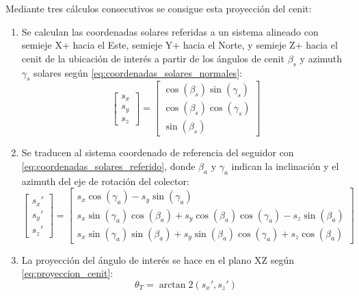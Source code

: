 Mediante tres cálculos consecutivos se consigue esta proyección del cenit:

\begin{enumerate}
    \item Se calculan las coordenadas solares referidas a un sistema alineado con semieje X+ hacia el Este, semieje Y+ hacia el Norte, y semieje Z+ hacia el cenit de la ubicación de interés a partir de los ángulos de cenit $\beta_s$ y azimuth $\gamma_s$ solares según \ref{eq:coordenadas_solares_normales}:
          \begin{equation} \label{eq:coordenadas_solares_normales}
              \begin{bmatrix}
                  s_x \\
                  s_y \\
                  s_z
              \end{bmatrix} = \begin{bmatrix}
                  \cos(\beta_s) \sin(\gamma_s) \\
                  \cos(\beta_s) \cos(\gamma_s) \\
                  \sin(\beta_s)
              \end{bmatrix}
          \end{equation}
    \item Se traducen al sistema coordenado de referencia del seguidor con \ref{eq:coordenadas_solares_referido}, donde $\beta_a$ y $\gamma_a$ indican la inclinación y el azimuth del eje de rotación del colector:
          \begin{equation} \label{eq:coordenadas_solares_referido}
              \begin{bmatrix}
                  s_x\prime \\
                  s_y\prime \\
                  s_z\prime
              \end{bmatrix} = \begin{bmatrix}
                  s_x \cos(\gamma_a) - s_y \sin(\gamma_a)                                                 \\
                  s_x \sin(\gamma_a) \cos(\beta_a) + s_y \cos(\beta_a) \cos(\gamma_a) - s_z \sin(\beta_a) \\
                  s_x \sin(\gamma_a) \sin(\beta_a) + s_y \sin(\beta_a) \cos(\gamma_a) + s_z \cos(\beta_a)
              \end{bmatrix}
          \end{equation}
    \item La proyección del ángulo de interés se hace en el plano XZ según \ref{eq:proyeccion_cenit}:
          \begin{equation} \label{eq:proyeccion_cenit}
              \theta_T = \arctan2(s_x\prime, s_z\prime)
          \end{equation}
\end{enumerate}


